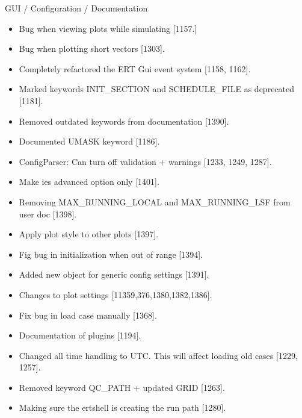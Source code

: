 \documentclass[a4paper,10pt,english]{sphinxmanual}
\begin{document}
GUI / Configuration / Documentation
\begin{itemize}
\item {} 
Bug when viewing plots while simulating {[}1157.{]}

\item {} 
Bug when plotting short vectors {[}1303{]}.

\item {} 
Completely refactored the ERT Gui event system {[}1158, 1162{]}.

\item {} 
Marked keywords INIT\_SECTION and SCHEDULE\_FILE as deprecated {[}1181{]}.

\item {} 
Removed outdated keywords from documentation {[}1390{]}.

\item {} 
Documented UMASK keyword {[}1186{]}.

\item {} 
ConfigParser: Can turn off validation + warnings {[}1233, 1249, 1287{]}.

\item {} 
Make ies advanced option only {[}1401{]}.

\item {} 
Removing MAX\_RUNNING\_LOCAL and MAX\_RUNNING\_LSF from user doc {[}1398{]}.

\item {} 
Apply plot style to other plots {[}1397{]}.

\item {} 
Fig bug in initialization when out of range {[}1394{]}.

\item {} 
Added new object for generic config settings {[}1391{]}.

\item {} 
Changes to plot settings {[}11359,376,1380,1382,1386{]}.

\item {} 
Fix bug in load case manually {[}1368{]}.

\item {} 
Documentation of plugins {[}1194{]}.

\item {} 
Changed all time handling to UTC. This will affect loading old cases {[}1229, 1257{]}.

\item {} 
Removed keyword QC\_PATH + updated GRID {[}1263{]}.

\item {} 
Making sure the ertshell is creating the run path {[}1280{]}.


\end{itemize}
\end{document}
